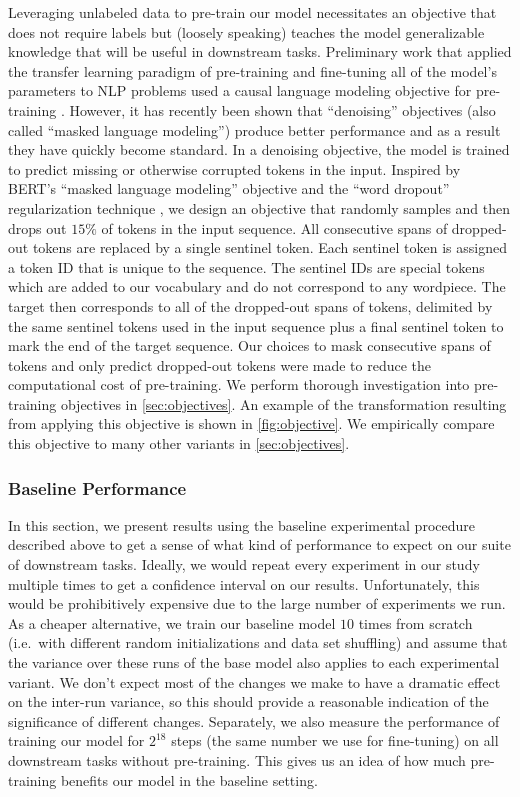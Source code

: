 \documentclass[twoside,11pt]{article}
\begin{document}
Leveraging unlabeled data to pre-train our model necessitates an objective that does not require labels but (loosely speaking) teaches the model generalizable knowledge that will be useful in downstream tasks.
Preliminary work that applied the transfer learning paradigm of pre-training and fine-tuning all of the model's parameters to NLP problems used a causal language modeling objective for pre-training \citep{dai2015semi,peters2018deep,radford2018improving,howard2018universal}.
However, it has recently been shown that ``denoising'' objectives \citep{devlin2018bert,taylor1953cloze} (also called ``masked language modeling'') produce better performance and as a result they have quickly become standard.
In a denoising objective, the model is trained to predict missing or otherwise corrupted tokens in the input.
Inspired by BERT's ``masked language modeling'' objective and the ``word dropout'' regularization technique \citep{bowman2015generating}, we design an objective that randomly samples and then drops out $15\%$ of tokens in the input sequence.
All consecutive spans of dropped-out tokens are replaced by a single sentinel token.
Each sentinel token is assigned a token ID that is unique to the sequence.
The sentinel IDs are special tokens which are added to our vocabulary and do not correspond to any wordpiece.
The target then corresponds to all of the dropped-out spans of tokens, delimited by the same sentinel tokens used in the input sequence plus a final sentinel token to mark the end of the target sequence.
Our choices to mask consecutive spans of tokens and only predict dropped-out tokens were made to reduce the computational cost of pre-training.
We perform thorough investigation into pre-training objectives in \cref{sec:objectives}.
An example of the transformation resulting from applying this objective is shown in \cref{fig:objective}.
We empirically compare this objective to many other variants in \cref{sec:objectives}.

\subsubsection{Baseline Performance}

In this section, we present results using the baseline experimental procedure described above to get a sense of what kind of performance to expect on our suite of downstream tasks.
Ideally, we would repeat every experiment in our study multiple times to get a confidence interval on our results.
Unfortunately, this would be prohibitively expensive due to the large number of experiments we run.
As a cheaper alternative, we train our baseline model $10$ times from scratch (i.e.\ with different random initializations and data set shuffling) and assume that the variance over these runs of the base model also applies to each experimental variant.
We don't expect most of the changes we make to have a dramatic effect on the inter-run variance, so this should provide a reasonable indication of the significance of different changes.
Separately, we also measure the performance of training our model for $2^{18}$ steps (the same number we use for fine-tuning) on all downstream tasks without pre-training.
This gives us an idea of how much pre-training benefits our model in the baseline setting.
\end{document}
